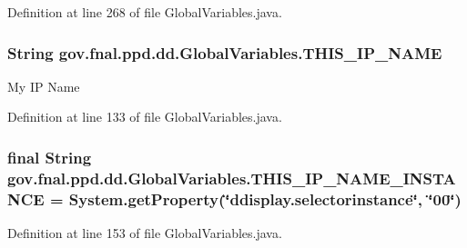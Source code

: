 Definition at line 268 of file Global\-Variables.\-java.

\hypertarget{classgov_1_1fnal_1_1ppd_1_1dd_1_1GlobalVariables_a35adf140ccbaaf275e34d1539424828a}{
\subsubsection[{T\-H\-I\-S\-\_\-\-I\-P\-\_\-\-N\-A\-M\-E}]{\setlength{\rightskip}{0pt plus 5cm}String gov.\-fnal.\-ppd.\-dd.\-Global\-Variables.\-T\-H\-I\-S\-\_\-\-I\-P\-\_\-\-N\-A\-M\-E\hspace{0.3cm}{\ttfamily [static]}}}\label{classgov_1_1fnal_1_1ppd_1_1dd_1_1GlobalVariables_a35adf140ccbaaf275e34d1539424828a}
My I\-P Name 

Definition at line 133 of file Global\-Variables.\-java.

\hypertarget{classgov_1_1fnal_1_1ppd_1_1dd_1_1GlobalVariables_ae5fe9c75fedaa742e5f68baad8768d7f}{
\subsubsection[{T\-H\-I\-S\-\_\-\-I\-P\-\_\-\-N\-A\-M\-E\-\_\-\-I\-N\-S\-T\-A\-N\-C\-E}]{\setlength{\rightskip}{0pt plus 5cm}final String gov.\-fnal.\-ppd.\-dd.\-Global\-Variables.\-T\-H\-I\-S\-\_\-\-I\-P\-\_\-\-N\-A\-M\-E\-\_\-\-I\-N\-S\-T\-A\-N\-C\-E = System.\-get\-Property(\char`\"{}ddisplay.\-selectorinstance\char`\"{}, \char`\"{}00\char`\"{})\hspace{0.3cm}{\ttfamily [static]}}}\label{classgov_1_1fnal_1_1ppd_1_1dd_1_1GlobalVariables_ae5fe9c75fedaa742e5f68baad8768d7f}


Definition at line 153 of file Global\-Variables.\-java.

